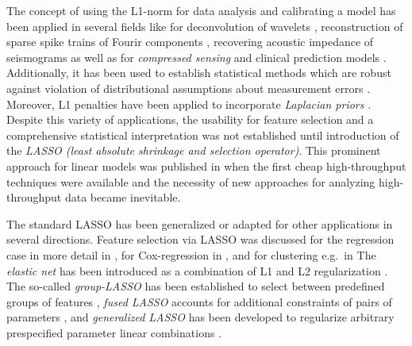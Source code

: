 \documentclass{bioinfo}
\begin{document}
The concept of using the L1-norm for data analysis and calibrating a model has been applied in several fields like for deconvolution of wavelets \citep{Taylor1979}, 
reconstruction of sparse spike trains of Fourir components \citep{Levy1981}, recovering acoustic impedance of seismograms \citep{Oldenburg1983} 
as well as for \emph{compressed sensing} \citep{Candes2008,Cheng2015} and clinical prediction models \citep{Hothorn2006}. 
Additionally, it has been used to establish statistical methods which are robust against violation of distributional assumptions about measurement errors \citep{Claerbout73, Barrodale1973}. Moreover, L1 penalties have been applied to incorporate \emph{Laplacian priors} \citep{xx}. 
%
Despite this variety of applications, the usability for feature selection and a comprehensive statistical interpretation was not established until introduction of the 
\emph{LASSO (least absolute shrinkage and selection operator)}. 
This prominent approach for linear models was published in \cite{Tibshirani94} when the first cheap high-throughput techniques were available and the necessity of new approaches for analyzing high-throughput data became inevitable.

The standard LASSO has been generalized or adapted for other applications in several directions. 
Feature selection via LASSO was discussed for the regression case in more detail in \cite{tibshirani96}, for Cox-regression in \cite{Tibshirani1997}, and for clustering e.g.~in \cite{Witten2010}
The \emph{elastic net} has been introduced as a combination of L1 and L2 regularization \citep{Zou05}. 
The so-called  \emph{group-LASSO} has been established to select between predefined groups of features \citep{Yuan2006}, \emph{fused LASSO} accounts for additional constraints of pairs of parameters \citep{Tibshirani2005}, and  \emph{generalized LASSO} has been developed to regularize arbitrary prespecified parameter linear combinations \citep{Tibshirani2011}.
\end{document}
